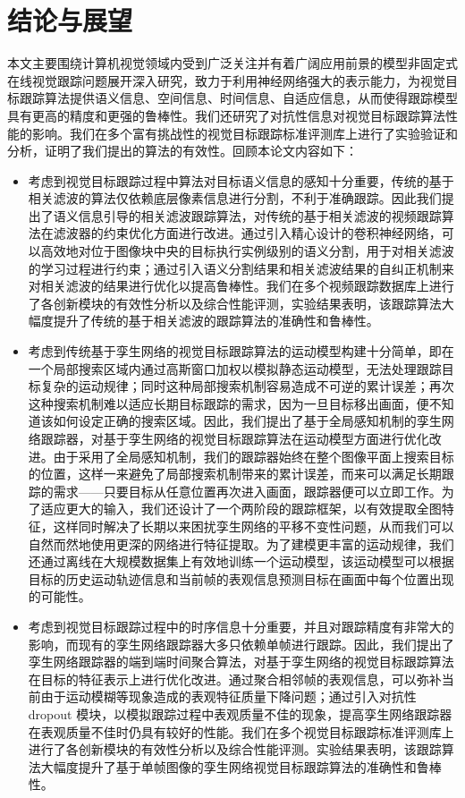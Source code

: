 \chapter{结论与展望}\label{chap:conclusion}
本文主要围绕计算机视觉领域内受到广泛关注并有着广阔应用前景的模型非固定式在线视觉跟踪问题展开深入研究，致力于利用神经网络强大的表示能力，为视觉目标跟踪算法提供语义信息、空间信息、时间信息、自适应信息，从而使得跟踪模型具有更高的精度和更强的鲁棒性。我们还研究了对抗性信息对视觉目标跟踪算法性能的影响。我们在多个富有挑战性的视觉目标跟踪标准评测库上进行了实验验证和分析，证明了我们提出的算法的有效性。回顾本论文内容如下：
\begin{itemize}
\item 考虑到视觉目标跟踪过程中算法对目标语义信息的感知十分重要，传统的基于相关滤波的算法仅依赖底层像素信息进行分割，不利于准确跟踪。因此我们提出了语义信息引导的相关滤波跟踪算法，对传统的基于相关滤波的视频跟踪算法在滤波器的约束优化方面进行改进。通过引入精心设计的卷积神经网络，可以高效地对位于图像块中央的目标执行实例级别的语义分割，用于对相关滤波的学习过程进行约束；通过引入语义分割结果和相关滤波结果的自纠正机制来对相关滤波的结果进行优化以提高鲁棒性。我们在多个视频跟踪数据库上进行了各创新模块的有效性分析以及综合性能评测，实验结果表明，该跟踪算法大幅度提升了传统的基于相关滤波的跟踪算法的准确性和鲁棒性。
\item 考虑到传统基于孪生网络的视觉目标跟踪算法的运动模型构建十分简单，即在一个局部搜索区域内通过高斯窗口加权以模拟静态运动模型，无法处理跟踪目标复杂的运动规律；同时这种局部搜索机制容易造成不可逆的累计误差；再次这种搜索机制难以适应长期目标跟踪的需求，因为一旦目标移出画面，便不知道该如何设定正确的搜索区域。因此，我们提出了基于全局感知机制的孪生网络跟踪器，对基于孪生网络的视觉目标跟踪算法在运动模型方面进行优化改进。由于采用了全局感知机制，我们的跟踪器始终在整个图像平面上搜索目标的位置，这样一来避免了局部搜索机制带来的累计误差，而来可以满足长期跟踪的需求——只要目标从任意位置再次进入画面，跟踪器便可以立即工作。为了适应更大的输入，我们还设计了一个两阶段的跟踪框架，以有效提取全图特征，这样同时解决了长期以来困扰孪生网络的平移不变性问题，从而我们可以自然而然地使用更深的网络进行特征提取。为了建模更丰富的运动规律，我们还通过离线在大规模数据集上有效地训练一个运动模型，该运动模型可以根据目标的历史运动轨迹信息和当前帧的表观信息预测目标在画面中每个位置出现的可能性。
\item 考虑到视觉目标跟踪过程中的时序信息十分重要，并且对跟踪精度有非常大的影响，而现有的孪生网络跟踪器大多只依赖单帧进行跟踪。因此，我们提出了孪生网络跟踪器的端到端时间聚合算法，对基于孪生网络的视觉目标跟踪算法在目标的特征表示上进行优化改进。通过聚合相邻帧的表观信息，可以弥补当前由于运动模糊等现象造成的表观特征质量下降问题；通过引入对抗性 dropout 模块，以模拟跟踪过程中表观质量不佳的现象，提高孪生网络跟踪器在表观质量不佳时仍具有较好的性能。我们在多个视觉目标跟踪标准评测库上进行了各创新模块的有效性分析以及综合性能评测。实验结果表明，该跟踪算法大幅度提升了基于单帧图像的孪生网络视觉目标跟踪算法的准确性和鲁棒性。

\end{itemize}
